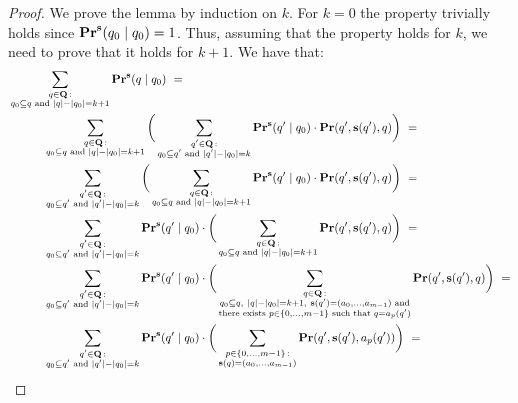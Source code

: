 \begin{proof}
We prove the lemma by induction on $k$. For $k=0$ the property trivially holds since $\mathbf{Pr}^{\mathbf{s}}(q_0 \mid q_0) = 1$. Thus, assuming that the property holds for $k$, we need to prove that it holds for $k+1$. We have that:
\begin{align*}
&\sum_{\substack{q \in \bQ \,: \\ q_0 \subseteq q \text{ {\rm and} } |q| - |q_0| = k+1}} \pr^{\bs}(q \mid q_0) \ =\\
&\hspace{30pt}\sum_{\substack{q \in \bQ \,: \\ q_0 \subseteq q \text{ {\rm and} } |q| - |q_0| = k+1}} 
\bigg(\sum_{\substack{q' \in \bQ \,: \\ q_0 \subseteq q' \text{ {\rm and} } |q'| - |q_0| = k}} \pr^{\bs}(q' \mid q_0) \cdot \pr(q',\bs(q'),q)\bigg) \ = \\
&\hspace{30pt}\sum_{\substack{q' \in \bQ \,: \\ q_0 \subseteq q' \text{ {\rm and} } |q'| - |q_0| = k}}
\bigg(\sum_{\substack{q \in \bQ \,: \\ q_0 \subseteq q \text{ {\rm and} } |q| - |q_0| = k+1}} 
 \pr^{\bs}(q' \mid q_0) \cdot \pr(q',\bs(q'),q)\bigg) \ =\\
 &\hspace{30pt}\sum_{\substack{q' \in \bQ \,: \\ q_0 \subseteq q' \text{ {\rm and} } |q'| - |q_0| = k}}
\pr^{\bs}(q' \mid q_0) \cdot \bigg(\sum_{\substack{q \in \bQ \,: \\ q_0 \subseteq q \text{ {\rm and} } |q| - |q_0| = k+1}} 
  \pr(q',\bs(q'),q)\bigg) \ =\\
&\hspace{30pt}\sum_{\substack{q' \in \bQ \,: \\ q_0 \subseteq q' \text{ {\rm and} } |q'| - |q_0| = k}}
\pr^{\bs}(q' \mid q_0) \cdot \bigg(\sum_{\substack{q \in \bQ \,: \\ q_0 \subseteq q,\ |q| - |q_0| = k+1,\ \bs(q') = (a_0, \ldots, a_{m-1}) \text{ {\rm and}}\\
\text{{\rm there exists }} p \in \{0, \ldots, m-1\} \text{ {\rm such that} } q = a_p(q')}}
  \pr(q',\bs(q'),q)\bigg) \ =\\
  &\hspace{30pt}\sum_{\substack{q' \in \bQ \,: \\ q_0 \subseteq q' \text{ {\rm and} } |q'| - |q_0| = k}}
\pr^{\bs}(q' \mid q_0) \cdot \bigg(\sum_{\substack{p \in \{0, \ldots, m-1\} \, : \\ \bs(q) = (a_0, \ldots, a_{m-1})}} \pr(q',\bs(q'),a_p(q'))\bigg) \ =\\

\end{align*}
\end{proof}
